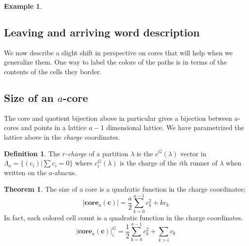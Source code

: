 \documentclass{amsart}[12pt]
\theoremstyle{definition}
\newtheorem{theorem}[dummy]{Theorem}
\newtheorem{example}[dummy]{Example}
\newtheorem{definition}[dummy]{Definition}
\newcommand{\core}{\mathbf{core}}
\begin{document}
\begin{example}
\begin{center}
\end{center}
\end{example}



\subsection{Leaving and arriving word description}

We now describe a slight shift in perspective on cores that will help when we generalize them.  One way to label the colors of the paths is in terms of the contents of the cells they border.  



\subsection{Size of an \texorpdfstring{$a$}{a}-core}
The core and quotient bijection above in particular gives a bijection between $a$-cores and points in a lattice $a-1$ dimensional lattice.  We have parametrized the lattice above in the \emph{charge} coordinates.  


\begin{definition}
The \emph{$r$-charge} of a partition $\lambda$ is the $c^G(\lambda)$ vector in $\Lambda_a=\{(c_i)|\sum c_i=0\}$ where $c_i^G(\lambda)$ is the charge of the $i$th runner of $\lambda$ when written on the $a$-abacus.
\end{definition}




\begin{theorem} \label{thm:quadratic-sl2}
The size of a core is a quadratic function in the charge coordinates;
$$|\core_a(\mathbf{c})|=\frac{a}{2}\sum_{k=0}^{a-1} c_k^2+ kc_k$$
In fact, each colored cell count is a quadratic function in the charge coordinates.
$$|\core_a(\mathbf{c})|^G_i=\frac{1}{2}\sum_{k=0}^{a-1} c_k^2+ \sum_{k>i}c_k$$
\end{theorem}
\end{document}
